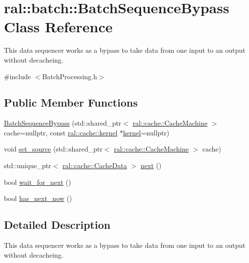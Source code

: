 \hypertarget{classral_1_1batch_1_1BatchSequenceBypass}{}\section{ral\+:\+:batch\+:\+:Batch\+Sequence\+Bypass Class Reference}
\label{classral_1_1batch_1_1BatchSequenceBypass}


This data sequencer works as a bypass to take data from one input to an output without decacheing.  




{\ttfamily \#include $<$Batch\+Processing.\+h$>$}

\subsection*{Public Member Functions}
\begin{DoxyCompactItemize}
\item 
\hyperlink{classral_1_1batch_1_1BatchSequenceBypass_aece145bb27dd1aa61252a831b8d0b536}{Batch\+Sequence\+Bypass} (std\+::shared\+\_\+ptr$<$ \hyperlink{classral_1_1cache_1_1CacheMachine}{ral\+::cache\+::\+Cache\+Machine} $>$ cache=nullptr, const \hyperlink{classral_1_1cache_1_1kernel}{ral\+::cache\+::kernel} $\ast$\hyperlink{classral_1_1cache_1_1kernel}{kernel}=nullptr)
\item 
void \hyperlink{classral_1_1batch_1_1BatchSequenceBypass_aaf3b8397046f0ad622a49c751861d983}{set\+\_\+source} (std\+::shared\+\_\+ptr$<$ \hyperlink{classral_1_1cache_1_1CacheMachine}{ral\+::cache\+::\+Cache\+Machine} $>$ cache)
\item 
std\+::unique\+\_\+ptr$<$ \hyperlink{classral_1_1cache_1_1CacheData}{ral\+::cache\+::\+Cache\+Data} $>$ \hyperlink{classral_1_1batch_1_1BatchSequenceBypass_a5d55f785961b21c82578223ab5a0a217}{next} ()
\item 
bool \hyperlink{classral_1_1batch_1_1BatchSequenceBypass_a623422aa9164a34bce024e92f4f26679}{wait\+\_\+for\+\_\+next} ()
\item 
bool \hyperlink{classral_1_1batch_1_1BatchSequenceBypass_a221ad94710394f83ebbeeabcc1851b22}{has\+\_\+next\+\_\+now} ()
\end{DoxyCompactItemize}


\subsection{Detailed Description}
This data sequencer works as a bypass to take data from one input to an output without decacheing. 

